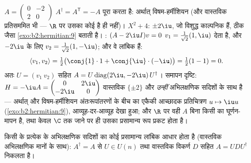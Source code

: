 \begin{example}[एक विषम-हर्मीशियन आव्यूह, विकर्णित]\label{ex:b2:hermitian:skewexample}
$A = \begin{pmatrix} 0 & -2\\ 2 & 0\end{pmatrix}$ $A^\dagger = A^{\mathsf T} = -A$ पूरा करता है: अर्थात् विषम-हर्मीशियन (और वास्तविक प्रतिसममित भी
--- $\R$ पर उसका कोई  है ही नहीं)।  $X^2 + 4$:
 $\pm2\iu$, जो विशुद्ध काल्पनिक हैं, ठीक जैसा \cref{exo:b2:hermitian:9} 
बताती है। : $(A - 2\iu I)v = 0$ $v_1 =
\frac{1}{\sqrt2}(1, \iu)$ देता है, और $-2\iu$ के लिए $v_2 = \frac{1}{\sqrt2}(1,
-\iu)$; और वे
लांबिक हैं:
\[
\langle v_1, v_2\rangle
= \tfrac12\bigl(\conj{1}\cdot1 +
\conj{\iu}\cdot(-\iu)\bigr)
= \tfrac12(1 - 1) = 0 .
\]
अतः  $U =
(v_1\ v_2)$ सहित $A = U\operatorname{diag}(2\iu, -2\iu)\,U^\dagger$। समापन दृष्टि: $H = -\iu A =
\begin{pmatrix} 0 & 2\iu\\ -2\iu & 0\end{pmatrix}$ वास्तविक  $\{\pm2\}$
और \emph{उन्हीं} अभिलक्षणिक सदिशों के साथ  है --- अर्थात्
 और विषम-हर्मीशियन अंतःरूपांतरणों के बीच का एकैकी आच्छादक
प्रतिचित्रण $u \mapsto \iu u$ (\cref{exo:b2:hermitian:9}), आव्यूह-दर-आव्यूह देखा हुआ; और $\R$ पर वही $A$
बिना किसी  का घूर्णन-मापन है, तथा केवल $\C$ तक जाने पर ही
उसका प्रसामान्य रूप प्रकट होता है।
\end{example}

\begin{theorem}[हर्मीशियन वर्णक्रमीय प्रमेय]\label{thm:b2:hermitian:spectral}
किसी  के प्रत्येक  के अभिलक्षणिक
सदिशों का कोई प्रसामान्य लांबिक आधार होता है (वास्तविक अभिलक्षणिक मानों के
साथ): $A^\dagger = A$ से $U \in U(n)$ तथा वास्तविक विकर्ण $D$ सहित $A = U D U^{\dagger}$ निकलता
है।
\end{theorem}

